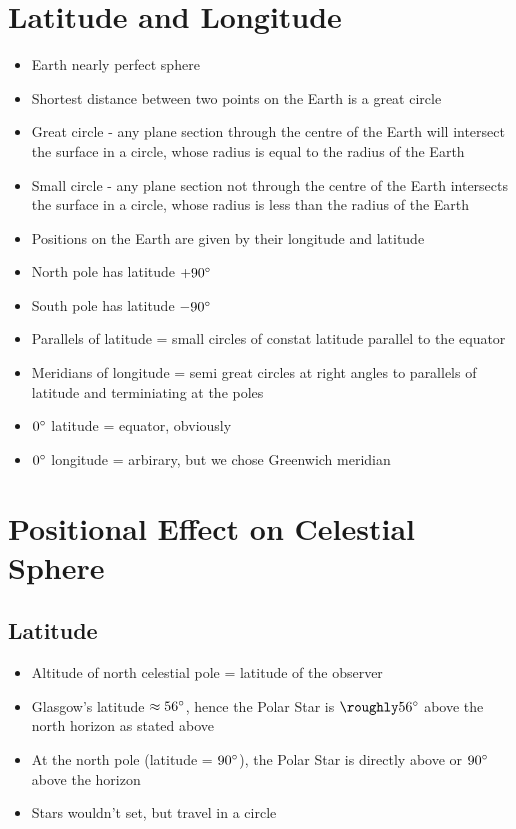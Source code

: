 \documentclass[a4paper, 11pt]{article}
\begin{document}
\section{Latitude and Longitude}
\begin{itemize}
\item Earth nearly perfect sphere
\item Shortest distance between two points on the Earth is a great circle
\item Great circle - any plane section through the centre of the Earth will intersect the surface in a circle, whose radius is equal to the radius of the Earth
\item Small circle - any plane section not through the centre of the Earth intersects the surface in a circle, whose radius is less than the radius of the Earth
\item Positions on the Earth are given by their longitude and latitude
\item North pole has latitude \(+90\degree\)
\item South pole has latitude \(-90\degree\)
\item Parallels of latitude = small circles of constat latitude parallel to the equator
\item Meridians of longitude = semi great circles at right angles to parallels of latitude and terminiating at the poles
\item \(0\degree\) latitude = equator, obviously
\item \(0\degree\) longitude = arbirary, but we chose Greenwich meridian
\end{itemize}

\section{Positional Effect on Celestial Sphere}
	\subsection{Latitude}
	\begin{itemize}
	\item Altitude of north celestial pole = latitude of the observer
	\item Glasgow's latitude \(\approx56\degree\), hence the Polar Star is \(\roughly56\degree\) above the north horizon as stated above
	\item At the north pole (latitude = \(90\degree\)), the Polar Star is directly above or \(90\degree\) above the horizon
	\item Stars wouldn't set, but travel in a circle
	\end{itemize}
\end{document}
